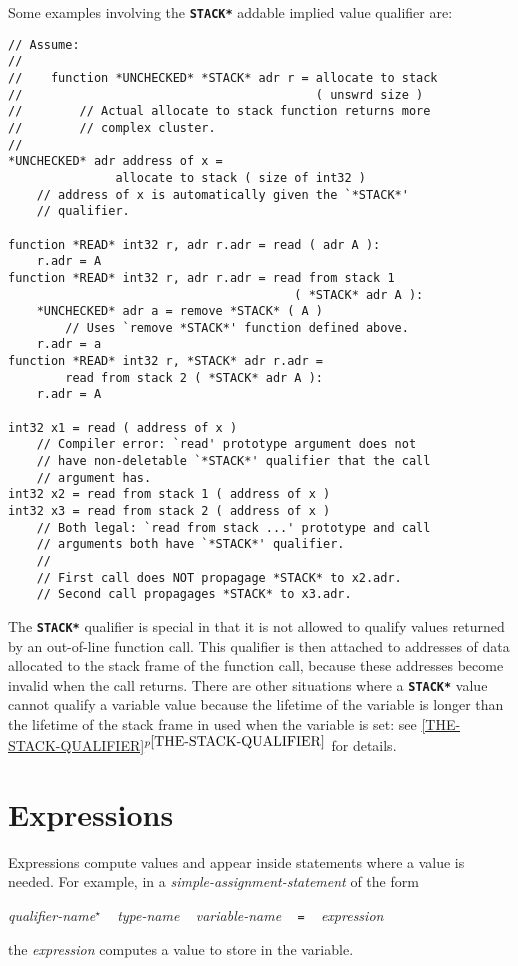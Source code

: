 \documentclass[12pt]{article}
\newcommand{\TT}[1]{{\tt \bfseries #1}}
\newcommand{\itemref}[1]{\ref{#1}$^{p\pageref{#1}}$}
\newcommand{\STAR}{{\Large $^\star$}}
\newenvironment{indpar}[1][0.3in]%
	{\begin{list}{}%
		     {\setlength{\itemsep}{0in}%
		      \setlength{\topsep}{0in}%
		      \setlength{\parsep}{1ex}%
		      \setlength{\labelwidth}{#1}%
		      \setlength{\leftmargin}{#1}%
		      \addtolength{\leftmargin}{\labelsep}}%
	 \item}%
	{\end{list}}
\begin{document}
Some examples involving the \TT{*STACK*} addable implied value
qualifier are:
\begin{indpar}\begin{verbatim}
// Assume:
//
//    function *UNCHECKED* *STACK* adr r = allocate to stack
//                                         ( unswrd size )
//        // Actual allocate to stack function returns more
//        // complex cluster.
//
*UNCHECKED* adr address of x =
               allocate to stack ( size of int32 )
    // address of x is automatically given the `*STACK*'
    // qualifier.

function *READ* int32 r, adr r.adr = read ( adr A ):
    r.adr = A
function *READ* int32 r, adr r.adr = read from stack 1
                                        ( *STACK* adr A ):
    *UNCHECKED* adr a = remove *STACK* ( A )
        // Uses `remove *STACK*' function defined above.
    r.adr = a
function *READ* int32 r, *STACK* adr r.adr =
        read from stack 2 ( *STACK* adr A ):
    r.adr = A

int32 x1 = read ( address of x )
    // Compiler error: `read' prototype argument does not
    // have non-deletable `*STACK*' qualifier that the call
    // argument has.
int32 x2 = read from stack 1 ( address of x )
int32 x3 = read from stack 2 ( address of x )
    // Both legal: `read from stack ...' prototype and call
    // arguments both have `*STACK*' qualifier.
    //
    // First call does NOT propagage *STACK* to x2.adr.
    // Second call propagages *STACK* to x3.adr.
\end{verbatim}\end{indpar}

The \TT{*STACK*} qualifier is special in that it is not allowed to qualify
values returned by an out-of-line function call.
This qualifier is then attached to addresses of data allocated
to the stack frame of the function call, because these addresses become
invalid when the call returns.  There are other situations where
a \TT{*STACK*} value cannot qualify a variable value because the
lifetime of the variable is longer than the lifetime of the
stack frame in used when the variable is set:
see \itemref{THE-STACK-QUALIFIER} for details.

\section{Expressions}
\label{EXPRESSIONS}

Expressions compute values and appear inside statements where a value is needed.
For example, in a {\em simple-assignment-statement} of the form
\begin{indpar}
{\em qualifier-name}\STAR{} ~ {\em type-name} ~ {\em variable-name}
	~ {\tt =} ~ {\em expression}
\end{indpar}
the {\em expression} computes a value to store in the variable.
\end{document}

